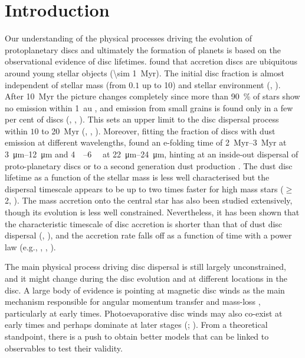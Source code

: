 \documentclass[usenatbib,useAMS,usedcolumn]{mnras}
\begin{document}
\section{Introduction}

Our understanding of the physical processes driving the evolution of protoplanetary discs and ultimately the formation of planets is based on the observational evidence of disc lifetimes.
 found that accretion discs are ubiquitous around young stellar objects (\SI{\sim 1}{Myr}). The initial disc fraction is almost independent of stellar mass (from $0.1$ up to \SI{10}{\solarmass}) and stellar environment (, ).
After \SI{10}{Myr} the picture changes completely since more than \SI{90}{\percent} of stars show no emission within \SI{1}{\astronomicalunit} , and emission from small grains is found only in a few per cent of discs (, , ).
This sets an upper limit to the disc dispersal process within $10$ to \SI{20}{Myr} (, , ). Moreover, fitting the fraction of discs with dust emission at different wavelengths,  found an e-folding time of \SIrange{2}{3}{Myr} at \SIrange[]{3}{12}{\micro\meter} and \SIrange[]{4}{6}{\mega\year} at \SIrange[]{22}{24}{\micro\meter}, hinting at an inside-out dispersal of proto-planetary discs or to a second generation dust production .
The dust disc lifetime as a function of the stellar mass is less well characterised but the dispersal timescale appears to be up to two times faster for high mass stars ($\geq$ \SI{2}{\solarmass}, ).
The mass accretion onto the central star has also been studied extensively, though its evolution is less well constrained. Nevertheless, it has been shown that the characteristic timescale of disc accretion is shorter than that of dust disc dispersal (, ), and the accretion rate falls off as a function of time with a power law (e.g., , , ).

The main physical process driving disc dispersal is still largely unconstrained, and it might change during the disc evolution and at different locations in the disc. A large body of evidence is pointing at magnetic disc winds as the main mechanism responsible for angular momentum transfer and mass-loss , particularly at early times. Photoevaporative disc winds may also co-exist at early times and perhaps dominate at later stages (; ). From a theoretical standpoint, there is a push to obtain better models that can be linked to observables to test their validity.
\end{document}
